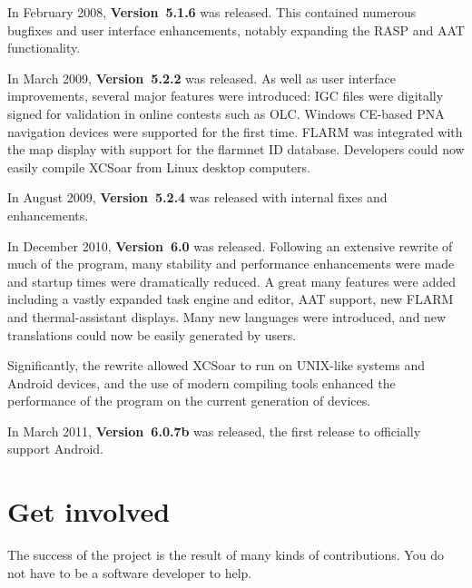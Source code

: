 In February 2008, {\bf Version~5.1.6} was released. This contained 
numerous bugfixes and user interface enhancements, notably expanding 
the RASP and AAT functionality.

In March 2009, {\bf Version~5.2.2} was released. As well as user
interface improvements, several major features were introduced:
IGC files were digitally signed for validation in online contests 
such as OLC.
Windows CE-based PNA navigation devices were supported for the
first time. 
FLARM was integrated with the map display with support for the
flarmnet ID database.
Developers could now easily compile XCSoar from Linux desktop
computers.

In August 2009, {\bf Version~5.2.4} was released with internal
fixes and enhancements.

In December 2010, {\bf Version~6.0} was released. Following an
extensive rewrite of much of the program, many stability and
performance enhancements were made and startup times were 
dramatically reduced. A great many features were added including 
a vastly expanded task engine and editor, AAT support, new FLARM
and thermal-assistant displays. Many new languages were introduced,
and new translations could now be easily generated by users.

Significantly, the rewrite allowed XCSoar to run on UNIX-like
systems and Android devices, and the use of modern compiling 
tools enhanced the performance of the program on the current
generation of devices.

In March 2011, {\bf Version~6.0.7b} was released, the first
release to officially support Android.

\section{Get involved}

The success of the project is the result of many kinds of
contributions.  You do not have to be a software developer to help.

